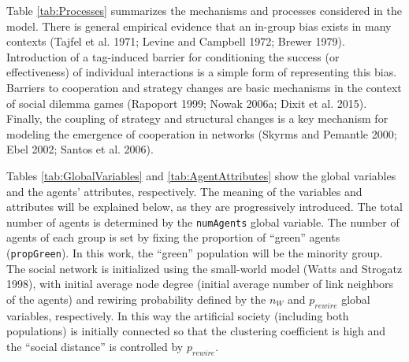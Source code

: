 Table \ref{tab:Processes} summarizes the mechanisms and processes considered in the model. There is general empirical evidence that an in-group bias exists in many contexts (Tajfel et al. 1971; Levine and Campbell 1972; Brewer 1979). Introduction of a tag-induced barrier for conditioning the success (or effectiveness) of individual interactions is a simple form of representing this bias. Barriers to cooperation and strategy changes are basic mechanisms in the context of social dilemma games (Rapoport 1999; Nowak 2006a; Dixit et al. 2015). Finally, the coupling of strategy and structural changes is a key mechanism for modeling the emergence of cooperation in networks (Skyrms and Pemantle 2000; Ebel 2002; Santos et al. 2006).

Tables \ref{tab:GlobalVariables} and \ref{tab:AgentAttributes} show the global variables and the agents' attributes, respectively. The meaning of the variables and attributes will be explained below, as they are progressively introduced. The total number of agents is determined by the \texttt{numAgents} global variable. The number of agents of each group is set by fixing the proportion of ``green'' agents (\texttt{propGreen}). In this work, the ``green'' population will be the minority group. The social network is initialized using the small-world model (Watts and Strogatz 1998), with initial average node degree (initial average number of link neighbors of the agents)  and rewiring probability defined by the $ n_W $ and $ p_{rewire} $ global variables, respectively. In this way the artificial society (including both populations) is initially connected so that the clustering coefficient is high and the ``social distance'' is controlled by $ p_{rewire} $. 
